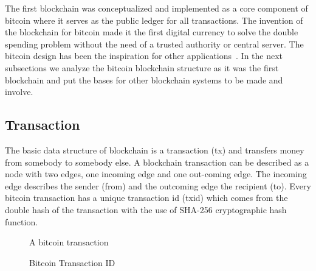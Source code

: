 The first blockchain was conceptualized and implemented as a core component of bitcoin where it serves as the public ledger for all transactions.
The invention of the blockchain for bitcoin made it the first digital currency to solve the double spending problem without the need of a trusted authority or central server. The bitcoin design has been the inspiration for other applications~\cite{7163021,10.1007/978-3-662-46803-6_10}. In the next subsections we analyze the bitcoin blockchain structure as it was the first blockchain and put the bases for other blockchain systems to be made and involve.

\subsection{Transaction}\label{blockchain:structure:tx}

The basic data structure of blockchain is a transaction (tx) and transfers money from somebody to somebody else. A blockchain transaction can be described as
a node with two edges, one incoming edge and one out-coming edge. The incoming edge describes the sender (from) and the outcoming edge the recipient (to).
Every bitcoin transaction has a unique transaction id (txid) which comes from the double hash of the transaction with the use of SHA-256 cryptographic hash function.

\begin{figure}[!ht]
  \centering
  \caption{A bitcoin transaction}
  \label{fig:bl_tx:tx}
\end{figure}

\begin{figure}
  \centering
  \caption{Bitcoin Transaction ID}
  \label{fig:bl_tx:id}
\end{figure}

